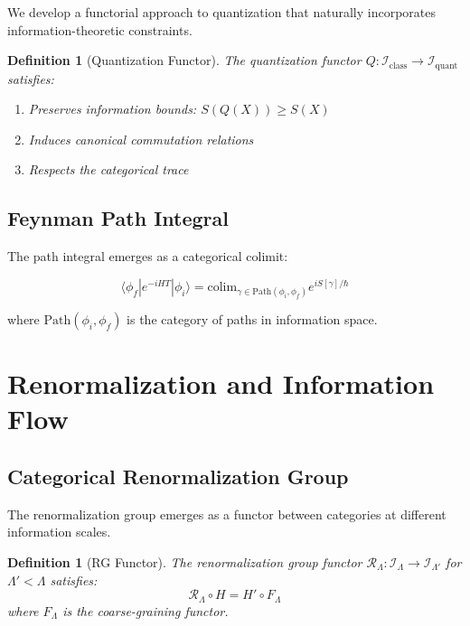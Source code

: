 \documentclass[12pt,a4paper]{article}
\newtheorem{definition}[theorem]{Definition}
\begin{document}
We develop a functorial approach to quantization that naturally incorporates information-theoretic constraints.

\begin{definition}[Quantization Functor]
The quantization functor $Q: \mathcal{I}_{\text{class}} \to \mathcal{I}_{\text{quant}}$ satisfies:
\begin{enumerate}
\item Preserves information bounds: $S(Q(X)) \geq S(X)$
\item Induces canonical commutation relations
\item Respects the categorical trace
\end{enumerate}
\end{definition}

\subsection{Feynman Path Integral}

The path integral emerges as a categorical colimit:

\begin{equation}
\langle \phi_f | e^{-iHT} | \phi_i \rangle = \text{colim}_{\gamma \in \text{Path}(\phi_i, \phi_f)} e^{iS[\gamma]/\hbar}
\end{equation}

where $\text{Path}(\phi_i, \phi_f)$ is the category of paths in information space.

\section{Renormalization and Information Flow}

\subsection{Categorical Renormalization Group}

The renormalization group emerges as a functor between categories at different information scales.

\begin{definition}[RG Functor]
The renormalization group functor $\mathcal{R}_\Lambda: \mathcal{I}_{\Lambda} \to \mathcal{I}_{\Lambda'}$ for $\Lambda' < \Lambda$ satisfies:
\begin{equation}
\mathcal{R}_\Lambda \circ H = H' \circ F_\Lambda
\end{equation}
where $F_\Lambda$ is the coarse-graining functor.
\end{definition}
\end{document}
